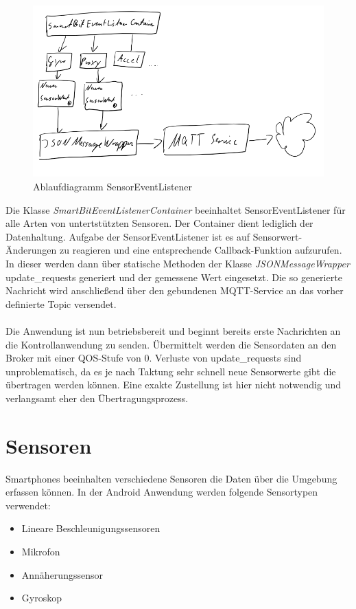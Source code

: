 \documentclass[11pt,a4paper]{report}
\begin{document}
\begin{figure}[htbp]
  \centering
  \includegraphics[width=.9\textwidth]{images/sensor_event_listener.png}
  \caption{Ablaufdiagramm SensorEventListener}
  \label{fig:sensor_event_listener}
\end{figure}
Die Klasse \textit{SmartBitEventListenerContainer} beeinhaltet SensorEventListener für alle Arten von untertstützten Sensoren.
Der Container dient lediglich der Datenhaltung.
Aufgabe der SensorEventListener ist es auf Sensorwert-Änderungen zu reagieren und eine entsprechende Callback-Funktion aufzurufen.
In dieser werden dann über statische Methoden der Klasse \textit{JSONMessageWrapper} update\_requests generiert und der gemessene Wert eingesetzt.
Die so generierte Nachricht wird anschließend über den gebundenen MQTT-Service an das vorher definierte Topic versendet.
\\\\
Die Anwendung ist nun betriebsbereit und beginnt bereits erste Nachrichten an die Kontrollanwendung zu senden.
Übermittelt werden die Sensordaten an den Broker mit einer QOS-Stufe von 0.
Verluste von update\_requests sind unproblematisch, da es je nach Taktung sehr schnell neue Sensorwerte gibt die übertragen werden können.
Eine exakte Zustellung ist hier nicht notwendig und verlangsamt eher den Übertragungsprozess.

\section{Sensoren}
Smartphones beeinhalten verschiedene Sensoren die Daten über die Umgebung erfassen können.
In der Android Anwendung werden folgende Sensortypen verwendet:
\begin{itemize}
  \item Lineare Beschleunigungssensoren
  \item Mikrofon
  \item Annäherungssensor
  \item Gyroskop
\end{itemize}
\end{document}
